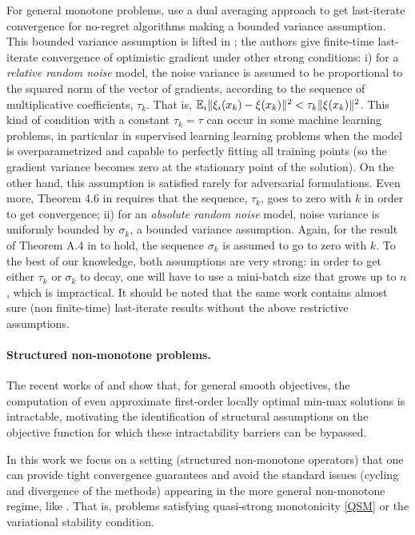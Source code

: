 \documentclass{article}
\begin{document}
For general monotone problems, \citet{mertikopoulos2019games} use a dual averaging approach to get last-iterate convergence for no-regret algorithms making a bounded variance assumption.
This bounded variance assumption is lifted in \citet{lin2020finite}; the authors give finite-time last-iterate convergence of optimistic gradient under other strong conditions: 
i) for a {\em relative random noise} model, the noise variance is assumed to be proportional to the squared norm of the vector of gradients, according to the sequence of multiplicative coefficients, $\tau_k$. That is, $\mathbb{E}_i\|\xi_i(x_k)-\xi(x_k)\|^2 < \tau_k \|\xi(x_k)\|^2$.
This kind of condition with a constant $\tau_k=\tau$ can occur in some machine learning problems, in particular in supervised learning learning problems when the model is overparametrized and capable to perfectly fitting all training points (so the gradient variance becomes zero at the stationary point of the solution). 
On the other hand, this assumption is satisfied rarely for adversarial formulations.
Even more, Theorem 4.6 in \citet{lin2020finite} requires that the sequence, $\tau_k$, goes to zero with $k$ in order to get convergence;
ii) for an {\em absolute random noise} model, noise variance is uniformly bounded by $\sigma_k$, a bounded variance assumption. 
Again, for the result of Theorem A.4 in \citet{lin2020finite} to hold, the sequence $\sigma_k$ is assumed to go to zero with $k$.
To the best of our knowledge, both assumptions are very strong: 
in order to get either $\tau_k$ or $\sigma_k$ to decay, one will have to use a mini-batch size that grows up to $n$, which is impractical.
It should be noted that the same work contains almost sure (non finite-time) last-iterate results without the above restrictive assumptions.

\paragraph{Structured non-monotone problems.} The recent works of \cite{daskalakis2021complexity} and \cite{diakonikolas2021efficient} show that, for general smooth objectives, the computation of even approximate first-order locally optimal min-max solutions is intractable, motivating the identification of structural assumptions on the objective function for which these intractability barriers can be bypassed.

In this work we focus on a setting (structured non-monotone operators) that one can provide tight convergence guarantees and avoid the standard issues (cycling and divergence of the methods) appearing in the more general non-monotone regime, like . That is, problems satisfying quasi-strong monotonicity \eqref{QSM} or the variational stability condition.
\end{document}
